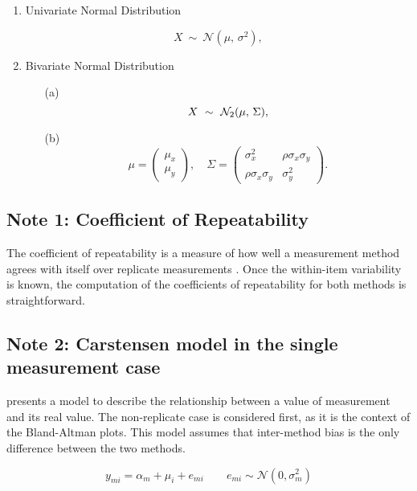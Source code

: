 \documentclass[12pt, a4paper]{article}
\theoremstyle{plain}
\theoremstyle{definition}
\theoremstyle{remark}
\begin{document}
\bigskip

\begin{enumerate}
\item Univariate Normal Distribution

\[
    X\ \sim\ \mathcal{N}(\mu,\, \sigma^2),
\]

\item Bivariate Normal Distribution

\begin{itemize}
\item[(a)] \[  X\ \sim\ \mathcal{N}_2(\mu,\, \Sigma), \vspace{1cm}\]
\item[(b)] \[    \mu = \begin{pmatrix} \mu_x \\ \mu_y \end{pmatrix}, \quad
    \Sigma = \begin{pmatrix} \sigma_x^2 & \rho \sigma_x \sigma_y \\
                             \rho \sigma_x \sigma_y  & \sigma_y^2 \end{pmatrix}.\]
\end{itemize}
\end{enumerate}
\newpage

\subsection{Note 1: Coefficient of Repeatability}
The coefficient of repeatability is a measure of how well a
measurement method agrees with itself over replicate measurements
\citep{BA99}. Once the within-item variability is known, the
computation of the coefficients of repeatability for both methods
is straightforward.

\subsection{Note 2: Carstensen model in the single measurement case}
\citet{BXC2004} presents a model to describe the relationship between a value of measurement and its real value.
The non-replicate case is considered first, as it is the context of the Bland-Altman plots.
This model assumes that inter-method bias is the only difference between the two methods.


\begin{equation}
y_{mi}  = \alpha_{m} + \mu_{i} + e_{mi} \qquad  e_{mi} \sim \mathcal{N}(0,\sigma^{2}_{m})
\end{equation}
\end{document}

